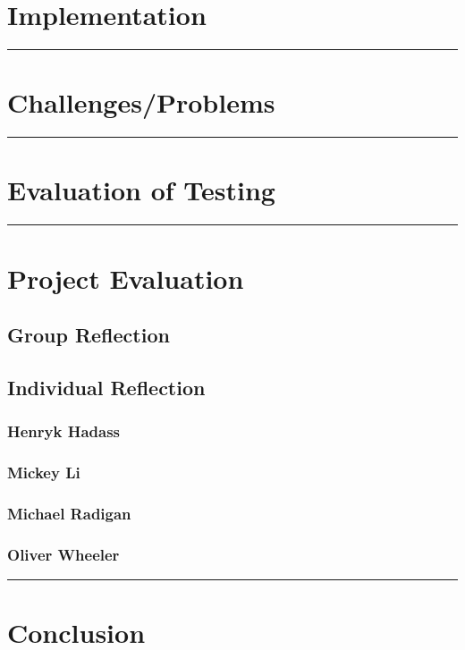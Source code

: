 \documentclass[11pt]{article}
\begin{document}
\section{Implementation}


\noindent
\rule{8cm}{0.6pt}
\section{Challenges/Problems}

\noindent
\rule{8cm}{0.6pt}
\section{Evaluation of Testing}

\noindent
\rule{8cm}{0.6pt}
\section{Project Evaluation}

\subsection{Group Reflection}

\subsection{Individual Reflection}

\subsubsection*{Henryk Hadass}

\subsubsection*{Mickey Li}

\subsubsection*{Michael Radigan}

\subsubsection*{Oliver Wheeler}


\noindent
\rule{8cm}{0.6pt}
\section{Conclusion}
\end{document}
